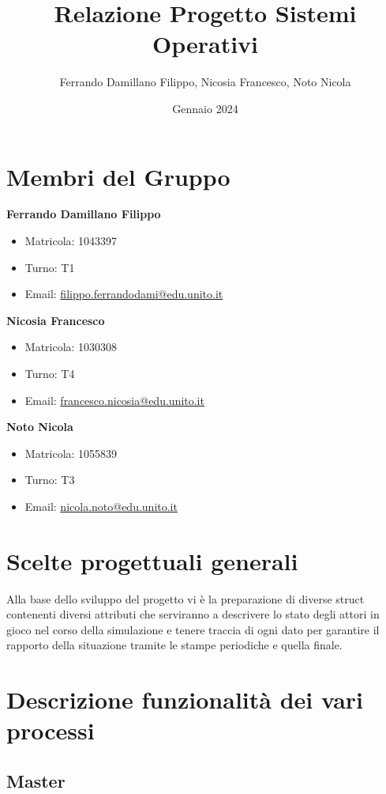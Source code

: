 \documentclass{article}
\title{Relazione Progetto Sistemi Operativi}
\author{Ferrando Damillano Filippo, Nicosia Francesco, Noto Nicola}
\date{Gennaio 2024}
\begin{document}
\maketitle

\tableofcontents

\section{Membri del Gruppo}

\textbf{Ferrando Damillano Filippo}
\begin{itemize}
    \item Matricola: 1043397
    \item Turno: T1    
    \item Email: \href{mailto:filippo.ferrandodami@edu.unito.it}{filippo.ferrandodami@edu.unito.it}
\end{itemize}
\textbf{Nicosia Francesco}
\begin{itemize}
    \item Matricola: 1030308
    \item Turno: T4
    \item Email: \href{mailto:francesco.nicosia@edu.unito.it}{francesco.nicosia@edu.unito.it}
\end{itemize}
\textbf{Noto Nicola}
\begin{itemize}
    \item Matricola: 1055839
    \item Turno: T3
    \item Email: \href{mailto:nicola.noto@edu.unito.it}{nicola.noto@edu.unito.it}
\end{itemize}


\section{Scelte progettuali generali}

Alla base dello sviluppo del progetto vi è la preparazione di diverse struct
contenenti diversi attributi che serviranno a descrivere lo stato degli attori in
gioco nel corso della simulazione e tenere traccia di ogni dato per garantire il
rapporto della situazione tramite le stampe periodiche e quella finale.

\section{Descrizione funzionalità dei vari processi}

\subsection{Master}
\end{document}
